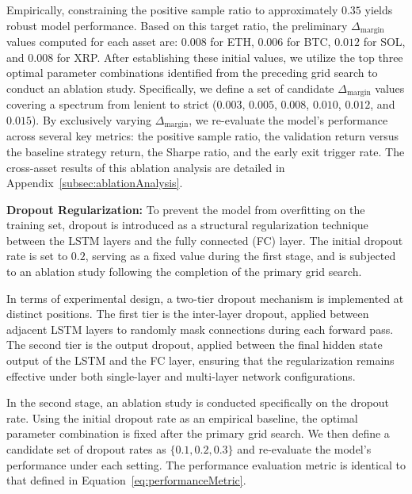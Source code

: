 \documentclass[12pt]{article}
\begin{document}
Empirically, constraining the positive sample ratio to approximately $0.35$ yields robust model performance. Based on this target ratio, the preliminary $\Delta_{\text{margin}}$ values computed for each asset are: $0.008$ for ETH, $0.006$ for BTC, $0.012$ for SOL, and $0.008$ for XRP. After establishing these initial values, we utilize the top three optimal parameter combinations identified from the preceding grid search to conduct an ablation study. Specifically, we define a set of candidate $\Delta_{\text{margin}}$ values covering a spectrum from lenient to strict ($0.003$, $0.005$, $0.008$, $0.010$, $0.012$, and $0.015$). By exclusively varying $\Delta_{\text{margin}}$, we re-evaluate the model's performance across several key metrics: the positive sample ratio, the validation return versus the baseline strategy return, the Sharpe ratio, and the early exit trigger rate. The cross-asset results of this ablation analysis are detailed in Appendix~\ref{subsec:ablationAnalysis}.

\textbf{Dropout Regularization:} To prevent the model from overfitting on the training set, dropout is introduced as a structural regularization technique between the LSTM layers and the fully connected (FC) layer. The initial dropout rate is set to $0.2$, serving as a fixed value during the first stage, and is subjected to an ablation study following the completion of the primary grid search.

In terms of experimental design, a two-tier dropout mechanism is implemented at distinct positions. The first tier is the inter-layer dropout, applied between adjacent LSTM layers to randomly mask connections during each forward pass. The second tier is the output dropout, applied between the final hidden state output of the LSTM and the FC layer, ensuring that the regularization remains effective under both single-layer and multi-layer network configurations.

In the second stage, an ablation study is conducted specifically on the dropout rate. Using the initial dropout rate as an empirical baseline, the optimal parameter combination is fixed after the primary grid search. We then define a candidate set of dropout rates as $\{0.1, 0.2, 0.3\}$ and re-evaluate the model's performance under each setting. The performance evaluation metric is identical to that defined in Equation~\ref{eq:performanceMetric}.
\end{document}
